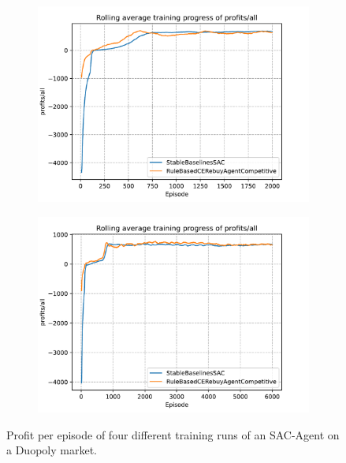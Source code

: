 \begin{figure}[t]
\begin{subfigure}{0.49\textwidth}
		\label{fig:SACDuopolyProfitsMean2}
	\end{subfigure}
	\begin{subfigure}{0.49\textwidth}
		\centering
		\includegraphics[width = \textwidth]{images/experiments/SACDuopoly/SACDuopolyProfitsMean3.pdf}\\
		\label{fig:SACDuopolyProfitsMean3}
	\end{subfigure}
	\begin{subfigure}{0.49\textwidth}
		\centering
		\includegraphics[width = \textwidth]{images/experiments/SACDuopoly/SACDuopolyProfitsMean4.pdf}\\
		\label{fig:SACDuopolyProfitsMean4}
	\end{subfigure}
	\caption{Profit per episode of four different training runs of an SAC-Agent on a Duopoly market.}\label{fig:SACDuopolyProfitsMean}
\end{figure}

